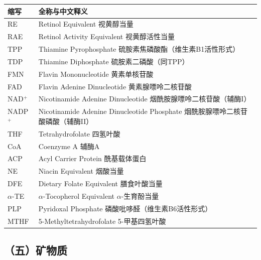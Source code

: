 \begin{table}[H]
\centering
\begin{tabularx}{\textwidth}{lX}
\toprule
\textbf{缩写} & \textbf{全称与中文释义} \\
\midrule
RE & Retinol Equivalent \hfill 视黄醇当量 \\
RAE & Retinol Activity Equivalent \hfill 视黄醇活性当量 \\
TPP & Thiamine Pyrophosphate \hfill 硫胺素焦磷酸酯（维生素B1活性形式） \\
TDP & Thiamine Diphosphate \hfill 硫胺素二磷酸（同TPP） \\
FMN & Flavin Mononucleotide \hfill 黄素单核苷酸 \\
FAD & Flavin Adenine Dinucleotide \hfill 黄素腺嘌呤二核苷酸 \\
NAD$^+$ & Nicotinamide Adenine Dinucleotide \hfill 烟酰胺腺嘌呤二核苷酸（辅酶I） \\
NADP$^+$ & Nicotinamide Adenine Dinucleotide Phosphate \hfill 烟酰胺腺嘌呤二核苷酸磷酸（辅酶II） \\
THF & Tetrahydrofolate \hfill 四氢叶酸 \\
CoA & Coenzyme A \hfill 辅酶A \\
ACP & Acyl Carrier Protein \hfill 酰基载体蛋白 \\
NE & Niacin Equivalent \hfill 烟酸当量 \\
DFE & Dietary Folate Equivalent \hfill 膳食叶酸当量 \\
$\alpha$-TE & $\alpha$-Tocopherol Equivalent \hfill $\alpha$-生育酚当量 \\
PLP & Pyridoxal Phosphate \hfill 磷酸吡哆醛（维生素B6活性形式） \\
MTHF & 5-Methyltetrahydrofolate \hfill 5-甲基四氢叶酸 \\
\bottomrule
\end{tabularx}
\end{table}

\subsection*{（五）矿物质}

